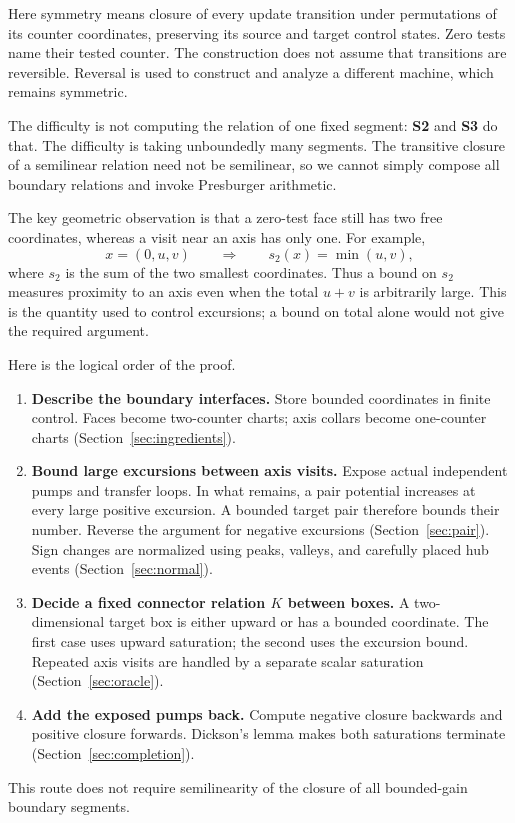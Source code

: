 \documentclass[11pt,a4paper]{article}
\theoremstyle{remark}
\begin{document}
Here symmetry means closure of every update transition under permutations of its counter coordinates, preserving its source and target control states. Zero tests name their tested counter. The construction does not assume that transitions are reversible. Reversal is used to construct and analyze a different machine, which remains symmetric.

The difficulty is not computing the relation of one fixed segment:
\textbf{S2} and \textbf{S3} do that. The difficulty is taking unboundedly
many segments. The transitive closure of a semilinear relation need not
be semilinear, so we cannot simply compose all boundary relations and
invoke Presburger arithmetic.

The key geometric observation is that a zero-test face still has two
free coordinates, whereas a visit near an axis has only one. For example,
\[
  x=(0,u,v)
  \qquad\Longrightarrow\qquad
  s_2(x)=\min(u,v),
\]
where \(s_2\) is the sum of the two smallest coordinates. Thus a bound
on \(s_2\) measures proximity to an axis even when the total
\(u+v\) is arbitrarily large. This is the quantity used to control
excursions; a bound on total alone would not give the required argument.

Here is the logical order of the proof.
\begin{enumerate}[leftmargin=*]
\item \textbf{Describe the boundary interfaces.}
Store bounded coordinates in finite control. Faces become two-counter
charts; axis collars become one-counter charts
(Section~\ref{sec:ingredients}).
\item \textbf{Bound large excursions between axis visits.}
Expose actual independent pumps and transfer loops. In what remains,
a pair potential increases at every large positive excursion. A bounded
target pair therefore bounds their number. Reverse the argument for
negative excursions (Section~\ref{sec:pair}). Sign changes are normalized
using peaks, valleys, and carefully placed hub events
(Section~\ref{sec:normal}).
\item \textbf{Decide a fixed connector relation \(K\) between boxes.}
A two-dimensional target box is either upward or has a bounded
coordinate. The first case uses upward saturation; the second uses the
excursion bound. Repeated axis visits are handled by a separate scalar
saturation (Section~\ref{sec:oracle}).
\item \textbf{Add the exposed pumps back.}
Compute negative closure backwards and positive closure forwards.
Dickson's lemma makes both saturations terminate
(Section~\ref{sec:completion}).
\end{enumerate}
This route does not require semilinearity of the closure of all
bounded-gain boundary segments.
\end{document}
